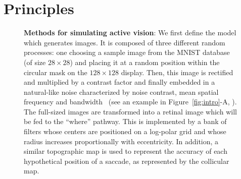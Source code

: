 \section{Principles}
\label{sec:principles}
\begin{figure}[t!]%
\ICANN
\else
{}
\fi
\caption{%
{\bf Methods for simulating active vision}:
\A We first define the model which generates images. It is composed of three different random processes: one choosing a sample image from the MNIST database (of size $28\times 28$) and placing it at a random position within the circular mask on the $128\times 128$ display. Then, this image is rectified and multiplied by a contrast factor and finally embedded in a natural-like noise characterized by noise contrast, mean spatial frequency and bandwidth~\citep{Sanz12} (see an example in  Figure~\ref{fig:intro}-A,  \DIS ). %
\B The full-sized images are transformed into a retinal image which will be fed to the ``where'' pathway. This is implemented by a bank of filters whose centers are positioned on a log-polar grid and whose radius increases proportionally with eccentricity. In addition, a similar topographic map is used to represent the accuracy of each hypothetical position of a saccade, as represented by the collicular map. %
}
\end{figure}
